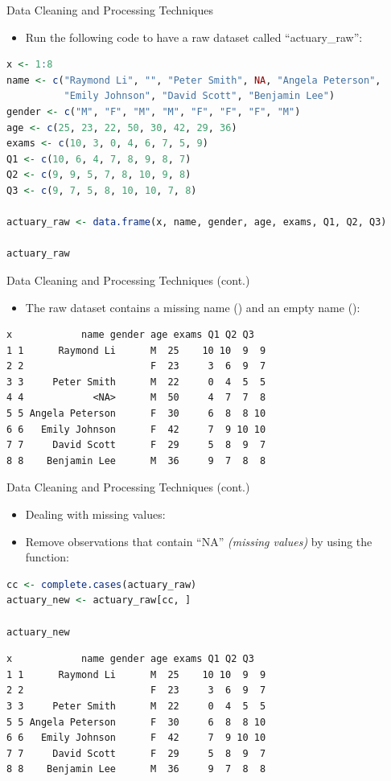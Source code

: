 \begin{frame}[fragile]{Data Cleaning and Processing Techniques}
\begin{itemize}
  \item Run the following code to have a raw dataset called “actuary\_raw”:
\end{itemize}
\begin{lstlisting}[language=R]
x <- 1:8
name <- c("Raymond Li", "", "Peter Smith", NA, "Angela Peterson",
          "Emily Johnson", "David Scott", "Benjamin Lee")
gender <- c("M", "F", "M", "M", "F", "F", "F", "M")
age <- c(25, 23, 22, 50, 30, 42, 29, 36)
exams <- c(10, 3, 0, 4, 6, 7, 5, 9)
Q1 <- c(10, 6, 4, 7, 8, 9, 8, 7)
Q2 <- c(9, 9, 5, 7, 8, 10, 9, 8)
Q3 <- c(9, 7, 5, 8, 10, 10, 7, 8)

actuary_raw <- data.frame(x, name, gender, age, exams, Q1, Q2, Q3)

actuary_raw
\end{lstlisting}
\end{frame}

\begin{frame}[fragile]{Data Cleaning and Processing Techniques (cont.)}
\begin{itemize}
  \item The raw dataset  contains a missing name () and an empty name ():
\end{itemize}
\begin{lstlisting}[style=output]
  x            name gender age exams Q1 Q2 Q3
1 1      Raymond Li      M  25    10 10  9  9
2 2                      F  23     3  6  9  7
3 3     Peter Smith      M  22     0  4  5  5
4 4            <NA>      M  50     4  7  7  8
5 5 Angela Peterson      F  30     6  8  8 10
6 6   Emily Johnson      F  42     7  9 10 10
7 7     David Scott      F  29     5  8  9  7
8 8    Benjamin Lee      M  36     9  7  8  8
\end{lstlisting}
\end{frame}

\begin{frame}[fragile]{Data Cleaning and Processing Techniques (cont.)}
\begin{itemize}
  \item Dealing with missing values:
  \item Remove observations that contain “NA” \textit{(missing values)} by using the  function:
\end{itemize}
\begin{lstlisting}[language=R]
cc <- complete.cases(actuary_raw) 
actuary_new <- actuary_raw[cc, ]

actuary_new
\end{lstlisting}
\begin{lstlisting}[style=output]
  x            name gender age exams Q1 Q2 Q3
1 1      Raymond Li      M  25    10 10  9  9
2 2                      F  23     3  6  9  7
3 3     Peter Smith      M  22     0  4  5  5
5 5 Angela Peterson      F  30     6  8  8 10
6 6   Emily Johnson      F  42     7  9 10 10
7 7     David Scott      F  29     5  8  9  7
8 8    Benjamin Lee      M  36     9  7  8  8
\end{lstlisting}
\end{frame}


